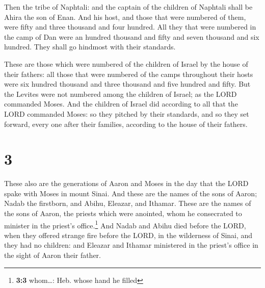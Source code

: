  Then the tribe of Naphtali: and the captain of the
children of Naphtali shall be Ahira the son of Enan.  And
his host, and those that were numbered of them, were fifty and three
thousand and four hundred.  All they that were numbered
in the camp of Dan were an hundred thousand and fifty and seven thousand
and six hundred. They shall go hindmost with their standards.

 These are those which were numbered of the children of
Israel by the house of their fathers: all those that were numbered of
the camps throughout their hosts were six hundred thousand and three
thousand and five hundred and fifty.  But the Levites
were not numbered among the children of Israel; as the LORD commanded
Moses.  And the children of Israel did according to all
that the LORD commanded Moses: so they pitched by their standards, and
so they set forward, every one after their families, according to the
house of their fathers.

\hypertarget{section-2}{%
\section{3}\label{section-2}}

 These also are the generations of Aaron and Moses in the
day that the LORD spake with Moses in mount Sinai.  And
these are the names of the sons of Aaron; Nadab the firstborn, and
Abihu, Eleazar, and Ithamar.  These are the names of the
sons of Aaron, the priests which were anointed, whom he consecrated to
minister in the priest's office.\footnote{\textbf{3:3} whom\ldots: Heb.
  whose hand he filled}  And Nadab and Abihu died before
the LORD, when they offered strange fire before the LORD, in the
wilderness of Sinai, and they had no children: and Eleazar and Ithamar
ministered in the priest's office in the sight of Aaron their father.

